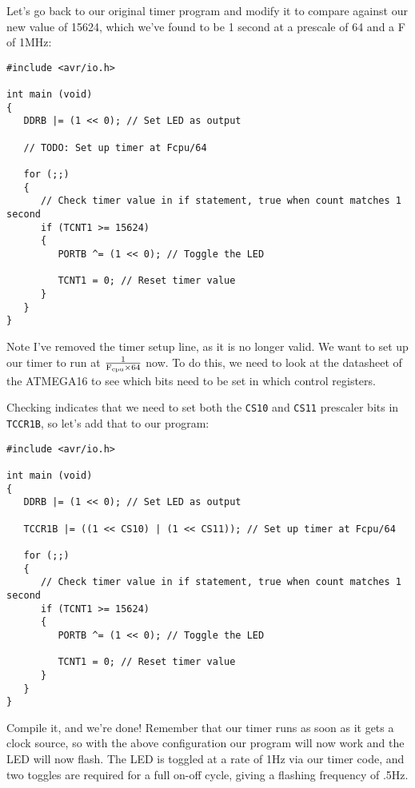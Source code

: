 \documentclass[a4paper,oneside,notitlepage]{book}
\begin{document}
Let's go back to our original timer program and modify it to compare against our new value of 15624, which we've found to be 1 second at a prescale of 64 and a F of 1MHz:

\begin{center}
\begin{lstlisting}
#include <avr/io.h>

int main (void)
{
   DDRB |= (1 << 0); // Set LED as output

   // TODO: Set up timer at Fcpu/64

   for (;;)
   {
      // Check timer value in if statement, true when count matches 1 second
      if (TCNT1 >= 15624)
      {
         PORTB ^= (1 << 0); // Toggle the LED

         TCNT1 = 0; // Reset timer value
      }
   }
}
\end{lstlisting}
\end{center}

Note I've removed the timer setup line, as it is no longer valid. We want to set up our timer to run at \(\frac{1}{\text{F\ensuremath{_{\textrm{cpu}}}}\times{64}}\) now. To do this, we need to look at the datasheet of the ATMEGA16 to see which bits need to be set in which control registers.

Checking indicates that we need to set both the \texttt{CS10} and \texttt{CS11} prescaler bits in \texttt{TCCR1B}, so let's add that to our program:

\begin{center}
\begin{lstlisting}
#include <avr/io.h>

int main (void)
{
   DDRB |= (1 << 0); // Set LED as output

   TCCR1B |= ((1 << CS10) | (1 << CS11)); // Set up timer at Fcpu/64

   for (;;)
   {
      // Check timer value in if statement, true when count matches 1 second
      if (TCNT1 >= 15624)
      {
         PORTB ^= (1 << 0); // Toggle the LED

         TCNT1 = 0; // Reset timer value
      }
   }
}
\end{lstlisting}
\end{center}

Compile it, and we're done! Remember that our timer runs as soon as it gets a clock source, so with the above configuration our program will now work and the LED will now flash. The LED is toggled at a rate of 1Hz via our timer code, and two toggles are required for a full on-off cycle, giving a flashing frequency of .5Hz.
\end{document}
